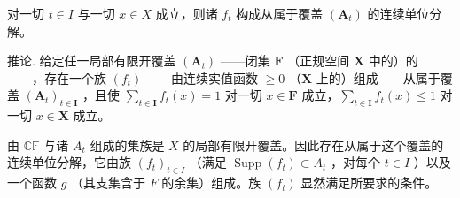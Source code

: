 对一切 \(t \in I\) 与一切 \(x \in X\) 成立，则诸 \(f_t\) 构成从属于覆盖 \((\mathbf{A}_t)\) 的连续单位分解。

推论. 给定任一局部有限开覆盖 \((\mathbf{A}_t)\) ——闭集 \(\mathbf{F}\) （正规空间 \(\mathbf{X}\) 中的）的——，存在一个族 \((f_t)\) ——由连续实值函数 \(\geqslant 0\) （\(\mathbf{X}\) 上的）组成——从属于覆盖 \((\mathbf{A}_t)_{t \in \mathbf{I}}\) ，且使 \(\sum_{t \in \mathbf{I}} f_t(x) = 1\) 对一切 \(x \in \mathbf{F}\) 成立，\(\sum_{t \in \mathbf{I}} f_t(x) \leqslant 1\) 对一切 \(x \in \mathbf{X}\) 成立。

由 \(\mathbb{CF}\) 与诸 \(A_{t}\) 组成的集族是 \(X\) 的局部有限开覆盖。因此存在从属于这个覆盖的连续单位分解，它由族 \((f_{t})_{t\in I}\) （满足 \(\operatorname{Supp}(f_t)\subset A_t\) ，对每个 \(t\in I\) ）以及一个函数 \(g\) （其支集含于 \(F\) 的余集）组成。族 \((f_{t})\) 显然满足所要求的条件。

